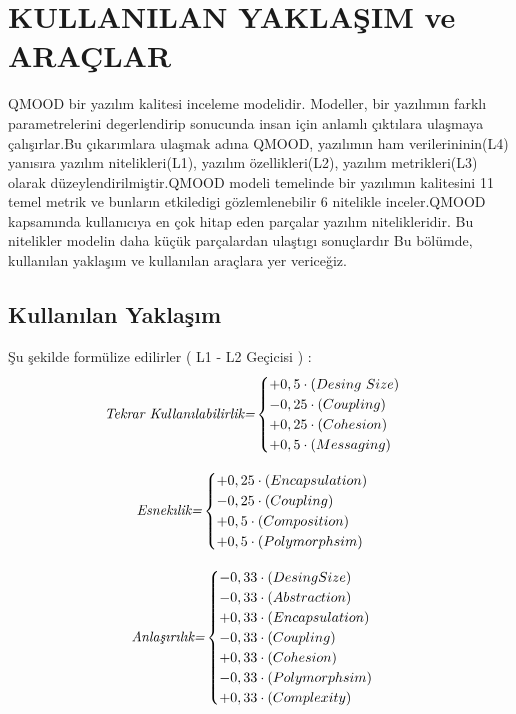 \documentclass[conference]{IEEEtran}
\begin{document}
\section{KULLANILAN YAKLAŞIM ve ARAÇLAR}\label{sec:uc}
QMOOD bir yazılım kalitesi inceleme modelidir. Modeller, bir yazılımın farklı parametrelerini degerlendirip sonucunda insan için anlamlı çıktılara ulaşmaya çalışırlar.Bu çıkarımlara ulaşmak adına QMOOD, yazılımın ham verilerininin(L4) yanısıra yazılım nitelikleri(L1), yazılım özellikleri(L2), yazılım metrikleri(L3) olarak düzeylendirilmiştir.QMOOD modeli temelinde bir yazılımın kalitesini 11 temel metrik ve bunların etkiledigi gözlemlenebilir 6 nitelikle inceler.QMOOD kapsamında kullanıcıya en çok hitap eden parçalar yazılım nitelikleridir. Bu nitelikler modelin daha küçük parçalardan ulaştıgı sonuçlardır Bu bölümde, kullanılan yaklaşım ve kullanılan araçlara yer vericeğiz.\\
\subsection{Kullanılan Yaklaşım}
Şu şekilde formülize edilirler ( L1 - L2 Geçicisi ) :
\begin{equation}
\textit{Tekrar Kullan{\i}labilirlik=}
\begin{cases}
+0,5\cdot(Desing~Size) &  \\
-0,25\cdot(Coupling) & \\
+0,25\cdot(Cohesion) &  \\
+0,5\cdot(Messaging)& \\
\end{cases}
\label{equ:reuse}
\end{equation}

\begin{equation}
\textit{Esnek{\i}lik=}
\begin{cases}
+0,25\cdot(Encapsulation) &  \\
-0,25\cdot(Coupling) & \\
+0,5\cdot(Composition) &  \\
+0,5\cdot(Polymorphsim)& \\
\end{cases}
\label{equ:reuse}
\end{equation}

\begin{equation}
\textit{Anlaşır{\i}lık=}
\begin{cases}
-0,33\cdot(Desing Size) &  \\
-0,33\cdot(Abstraction) & \\
+0,33\cdot(Encapsulation) &  \\
-0,33\cdot(Coupling) & \\
+0,33\cdot(Cohesion) & \\
-0,33\cdot(Polymorphsim)& \\
+0,33\cdot(Complexity) & \\
\end{cases}
\label{equ:reuse}
\end{equation}
\end{document}
